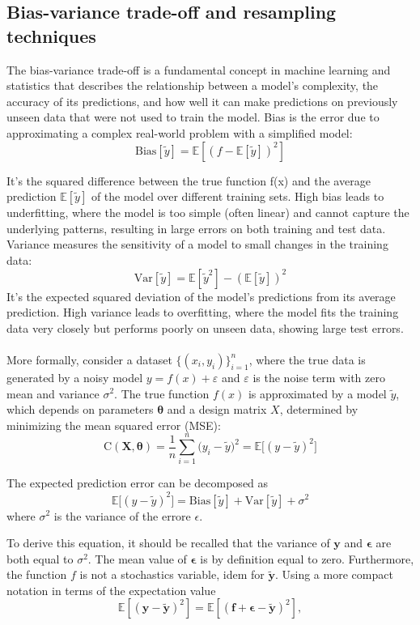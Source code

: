 \documentclass[
 reprint,            %
 amsmath,amssymb,
 aps,
]{revtex4-2}
\begin{document}
\subsection{Bias-variance trade-off and resampling techniques}

The bias-variance trade-off is a fundamental concept in machine learning and statistics that describes the relationship between a model's complexity, the accuracy of its predictions, and how well it can make predictions on previously unseen data that were not used to train the model\cite{hjorthjensen_week38}. 
Bias is the error due to approximating a complex real-world problem with a simplified model: 
$$\mathrm{Bias}[\tilde y]= \mathbb{E}[(f-\mathbb{E}[\tilde y])^2]$$

It's the squared difference between the true function f(x) and the average prediction $\mathbb{E}[\tilde y]$ of the model over different training sets. High bias leads to underfitting, where the model is too simple (often linear) and cannot capture the underlying patterns, resulting in large errors on both training and test data.
\\Variance measures the sensitivity of a model to small changes in the training data:
$$
\mathrm{Var}[\tilde y] = \mathbb{E}[\tilde y^2] - (\mathbb{E}[\tilde y])^2
$$
It's the expected squared deviation of the model's predictions from its average prediction.
High variance leads to overfitting, where the model fits the training data very closely but performs poorly on unseen data, showing large test errors.\\\\
More formally, consider a dataset $\{(x_i, y_i)\}_{i=1}^n$, where the true data is generated by a noisy model $y = f(x) + \varepsilon$ and $\varepsilon$ is the noise term with zero mean and variance $\sigma^2$. 
The true function $f(x)$ is approximated by a model $\tilde y$, which depends on parameters $\boldsymbol{\theta}$ and a design matrix $X$, determined by minimizing the mean squared error (MSE):
$$
\text{C}(\boldsymbol{X, \theta}) = \frac{1}{n} \sum_{i=1}^n \big( y_i - \tilde y \big)^2= \mathbb{E}\big[(y - \tilde y)^2\big]
$$

The expected prediction error can be decomposed as
$$\mathbb{E}[(y - \tilde y)^2\big] = \mathrm{Bias}[\tilde y] + \mathrm{Var}[\tilde y] + \sigma^2$$
where $\sigma ^2$ is the variance of the errore $\epsilon$. 

To derive this equation, it should be recalled that the variance of $\boldsymbol{y}$ and $\boldsymbol{\epsilon}$ are both equal to $\sigma^2$. The mean value of $\boldsymbol{\epsilon}$ is by definition equal to zero. Furthermore, the function $f$ is not a stochastics variable, idem for $\boldsymbol{\tilde{y}}$.
Using a more compact notation in terms of the expectation value
$$
\mathbb{E}\left[(\boldsymbol{y}-\boldsymbol{\tilde{y}})^2\right]=\mathbb{E}\left[(\boldsymbol{f}+\boldsymbol{\epsilon}-\boldsymbol{\tilde{y}})^2\right],
$$
\end{document}
